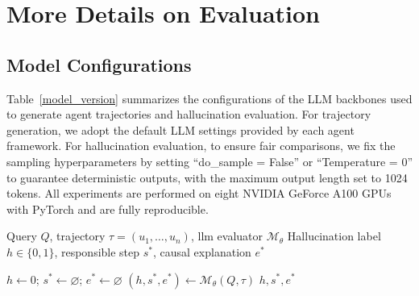 \section{More Details on Evaluation}

\subsection{Model Configurations}
Table~\ref{model_version} summarizes the configurations of the LLM backbones used to generate agent trajectories and hallucination evaluation. For trajectory generation, we adopt the default LLM settings provided by each agent framework. For hallucination evaluation, to ensure fair comparisons, we fix the sampling hyperparameters by setting “do\_sample = False” or “Temperature = 0” to guarantee deterministic outputs, with the maximum output length set to 1024 tokens. All experiments are performed on eight NVIDIA GeForce A100 GPUs with PyTorch and are fully reproducible.

\begin{algorithm}[htb]
\setlength{\lineskip}{0.1em}
\setlength{\lineskiplimit}{0.1em}
\caption{Standard Prompting}
\label{alg:standard_prompting}
\begin{algorithmic}[1]
\Require Query $Q$, trajectory $\tau = (u_1, \ldots, u_n)$, llm evaluator $\mathcal{M}_{\theta}$
\Ensure Hallucination label $h\in\{0,1\}$, responsible step $s^*$, causal explanation $e^*$

\State $h \gets 0$; $s^* \gets \varnothing$; $e^* \gets \varnothing$
\State $(h, s^*, e^*) \gets \mathcal{M}_{\theta}(Q, \tau)$
\State \Return $h, s^*, e^*$ 
\end{algorithmic}
\end{algorithm}

